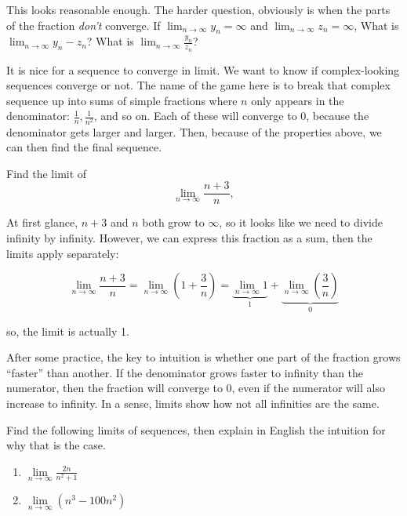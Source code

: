 \documentclass[]{book}
\providecommand{\tightlist}{%
  \setlength{\itemsep}{0pt}\setlength{\parskip}{0pt}}
\theoremstyle{definition}
\theoremstyle{definition}
\theoremstyle{definition}
\theoremstyle{remark}
\let\BeginKnitrBlock\begin \let\EndKnitrBlock\end
\begin{document}
This looks reasonable enough. The harder question, obviously is when the parts of the fraction \emph{don't} converge. If \(\lim_{n\to\infty} y_n = \infty\) and \(\lim_{n\to\infty} z_n = \infty\), What is \(\lim_{n\to\infty} y_n - z_n\)? What is \(\lim_{n\to\infty} \frac{y_n}{z_n}\)?

It is nice for a sequence to converge in limit. We want to know if complex-looking sequences converge or not. The name of the game here is to break that complex sequence up into sums of simple fractions where \(n\) only appears in the denominator: \(\frac{1}{n}, \frac{1}{n^2}\), and so on. Each of these will converge to 0, because the denominator gets larger and larger. Then, because of the properties above, we can then find the final sequence.

\BeginKnitrBlock{example}[Simplifying a Fraction into Sums]
\protect\hypertarget{exm:unnamed-chunk-3}{}{\label{exm:unnamed-chunk-3} {} }Find the limit of
\[\lim_{n\to \infty} \frac{n + 3}{n},\]
\EndKnitrBlock{example}

\BeginKnitrBlock{solution}
{}At first glance, \(n + 3\) and \(n\) both grow to \(\infty\), so it looks like we need to divide infinity by infinity. However, we can express this fraction as a sum, then the limits apply separately:

\[\lim_{n\to \infty} \frac{n + 3}{n} = \lim_{n\to \infty} \left(1 + \frac{3}{n}\right) =  \underbrace{\lim_{n\to \infty}1}_{1} +  \underbrace{\lim_{n\to \infty}\left(\frac{3}{n}\right)}_{0}\]

so, the limit is actually 1.
\EndKnitrBlock{solution}

After some practice, the key to intuition is whether one part of the fraction grows ``faster'' than another. If the denominator grows faster to infinity than the numerator, then the fraction will converge to 0, even if the numerator will also increase to infinity. In a sense, limits show how not all infinities are the same.

\BeginKnitrBlock{exercise}
\protect\hypertarget{exr:limseq2}{}{\label{exr:limseq2} }Find the following limits of sequences, then explain in English the intuition for why that is the case.

\begin{enumerate}
\def\labelenumi{\arabic{enumi}.}
\tightlist
\item
  \(\lim\limits_{n\to\infty} \frac{2n}{n^2 + 1}\)
\item
  \(\lim\limits_{n\to\infty} (n^3 - 100n^2)\)
\end{enumerate}
\EndKnitrBlock{exercise}
\end{document}
